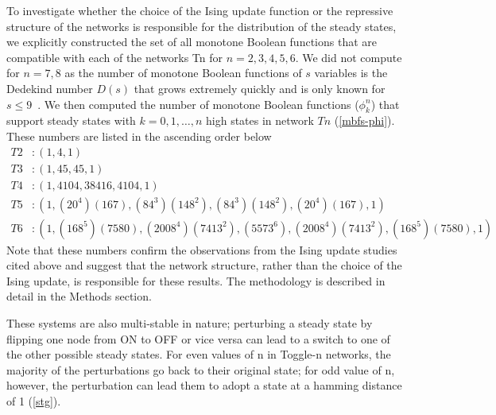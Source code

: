 \documentclass[11pt,a4paper]{article}
\theoremstyle{definition}
\theoremstyle{remark}
\begin{document}
To investigate whether the choice of the Ising update function or the repressive structure of the networks is responsible for the distribution of the steady states, we explicitly constructed the set of all monotone Boolean functions that are compatible with each of the networks Tn for $n=2,3,4,5,6$. We did not compute for $n=7,8$ as the number of monotone Boolean functions of $s$ variables is the Dedekind number $D(s)$ that grows extremely quickly and is only known for $s\leq 9$~\parencite{fidytek_algorithms_2001,jakel_computation_2023}. We then computed the number of monotone Boolean functions ($\phi_k^n$) that support steady states with $k = 0,1, \ldots, n$ high states in network $Tn$ (\cref{mbfs-phi}). These numbers are listed in the ascending order below
\begin{align*}
T2 &: (1,4,1) \\
T3 &:  (1,45,45,1) \\
T4 &: (1,4104, 38416, 4104, 1) \\
T5 &: (1, (20^4)(167), (84^3)(148^2),(84^3)(148^2), (20^4)(167),1) \\
T6 &: (1, (168^5)(7580), (2008^4)(7413^2), (5573^6), (2008^4)(7413^2), (168^5)(7580), 1) 
\end{align*}
Note that these numbers confirm the observations from the Ising update studies cited above and suggest that the network structure, rather than the choice of the Ising update, is responsible for these results. The methodology is described in detail in the Methods section.

These systems are also multi-stable in nature; perturbing a steady state by flipping one node from ON to OFF or vice versa can lead to a switch to one of the other possible steady states. For even values of n in Toggle-n networks, the majority of the perturbations go back to their original state; for odd value of n, however, the perturbation can lead them to adopt a state at a hamming distance of 1 (\cref{stg}).
\end{document}
